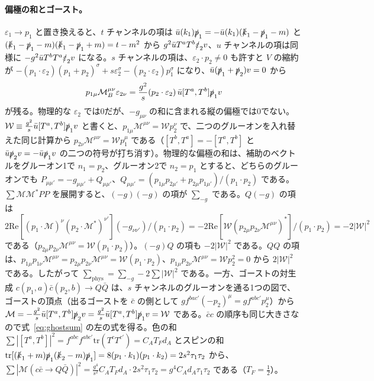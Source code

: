 \documentclass[a4paper,10pt]{ltjsarticle}
\newcommand{\tr}{\mathrm{tr}}
\begin{document}
\paragraph{偏極の和とゴースト。}$\varepsilon_1\to p_1$ と置き換えると、$t$ チャンネルの項は $\bar u(k_1)\slashed p_1=-\bar u(k_1)(\slashed k_1-\slashed p_1-m)$ と $(\slashed k_1-\slashed p_1-m)(\slashed k_1-\slashed p_1+m)=t-m^2$ から $g^2\bar uT^aT^b\slashed\varepsilon_2v$、$u$ チャンネルの項は同様に $-g^2\bar uT^bT^a\slashed\varepsilon_2v$ になる。$s$ チャンネルの項は、$\varepsilon_2\cdot p_2\ne0$ も許すと $V$ の縮約が $-(p_1\cdot\varepsilon_2)(p_1+p_2)^\sigma+s\varepsilon_2^\sigma-(p_2\cdot\varepsilon_2)p_1^\sigma$ になり、$\bar u(\slashed p_1+\slashed p_2)v=0$ から
\begin{equation*}
p_{1\mu}\mathcal M_B^{\mu\nu}\varepsilon_{2\nu}=\frac{g^2}{s}(p_2\cdot\varepsilon_2)\,\bar u[T^a,T^b]\slashed p_1v
\end{equation*}
が残る。物理的な $\varepsilon_2$ では0だが、$-g_{\mu\nu}$ の和に含まれる縦の偏極では0でない。$\mathcal W\equiv\frac{g^2}s\bar u[T^a,T^b]\slashed p_1v$ と書くと、$p_{1\mu}\mathcal M^{\mu\nu}=\mathcal Wp_2^\nu$ で、二つのグルーオンを入れ替えた同じ計算から $p_{2\nu}\mathcal M^{\mu\nu}=\mathcal Wp_1^\mu$ である（$[T^b,T^a]=-[T^a,T^b]$ と $\bar u\slashed p_2v=-\bar u\slashed p_1v$ の二つの符号が打ち消す）。物理的な偏極の和は、補助のベクトルをグルーオン1で $n_1=p_2$、グルーオン2で $n_2=p_1$ とすると、どちらのグルーオンでも $P_{\mu\mu'}=-g_{\mu\mu'}+Q_{\mu\mu'}$、$Q_{\mu\mu'}=(p_{1\mu}p_{2\mu'}+p_{2\mu}p_{1\mu'})/(p_1\cdot p_2)$ である。$\sum\mathcal M\mathcal M^*PP$ を展開すると、$(-g)(-g)$ の項が $\sum_{-g}$ である。$Q(-g)$ の項は $2\mathrm{Re}[(p_1\cdot\mathcal M)^\nu(p_2\cdot\mathcal M^*)^{\nu'}](-g_{\nu\nu'})/(p_1\cdot p_2)=-2\mathrm{Re}[\mathcal W(p_{2\mu}p_{2\nu}\mathcal M^{\mu\nu})^*]/(p_1\cdot p_2)=-2|\mathcal W|^2$ である（$p_{2\mu}p_{2\nu}\mathcal M^{\mu\nu}=\mathcal W(p_1\cdot p_2)$）。$(-g)Q$ の項も $-2|\mathcal W|^2$ である。$QQ$ の項は、$p_{1\mu}p_{1\nu}\mathcal M^{\mu\nu}=p_{2\mu}p_{2\nu}\mathcal M^{\mu\nu}=\mathcal W(p_1\cdot p_2)$、$p_{1\mu}p_{2\nu}\mathcal M^{\mu\nu}=\mathcal Wp_2^2=0$ から $2|\mathcal W|^2$ である。したがって $\sum_{\mathrm{phys}}=\sum_{-g}-2\sum|\mathcal W|^2$ である。一方、ゴーストの対生成 $c(p_1,a)\bar c(p_2,b)\to Q\bar Q$ は、$s$ チャンネルのグルーオンを通る1つの図で、ゴーストの頂点（出るゴーストを $\bar c$ の側として $gf^{bac'}(-p_2)^\mu=gf^{abc'}p_2^\mu$）から $\mathcal M=-\frac{g^2}s\bar u[T^a,T^b]\slashed p_2v=\frac{g^2}s\bar u[T^a,T^b]\slashed p_1v=\mathcal W$ である。$\bar cc$ の順序も同じ大きさなので式~\eqref{eq:ghostsum} の左の式を得る。色の和 $\sum|[T^a,T^b]|^2=f^{abc}f^{abc'}\tr(T^cT^{c'})=C_AT_Fd_A$ とスピンの和 $\tr[(\slashed k_1+m)\slashed p_1(\slashed k_2-m)\slashed p_1]=8(p_1\cdot k_1)(p_1\cdot k_2)=2s^2\tau_1\tau_2$ から、$\sum|\mathcal M(c\bar c\to Q\bar Q)|^2=\frac{g^4}{s^2}C_AT_Fd_A\cdot2s^2\tau_1\tau_2=g^4C_Ad_A\tau_1\tau_2$ である（$T_F=\frac12$）。
\end{document}
